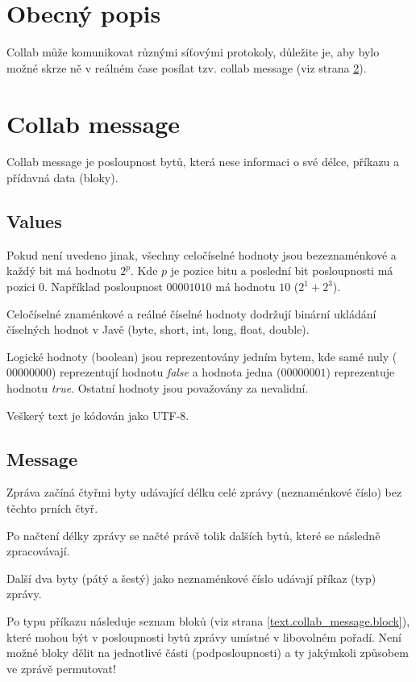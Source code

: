 \documentclass[12pt,oneside,a4paper]{report}
\begin{document}
\tableofcontents
\newpage

\chapter{Obecný popis}

Collab může komunikovat různými síťovými protokoly, důležite je, aby bylo možné skrze ně v reálném čase posílat tzv. collab message (viz strana \ref{text.collab_message}).

\chapter{Collab message}
\label{text.collab_message}

Collab message je posloupnost bytů, která nese informaci o své délce, příkazu a přídavná data (bloky).

\section{Values}

Pokud není uvedeno jinak, všechny celočíselné hodnoty jsou bezeznaménkové a každý bit má hodnotu $2^{p}$. Kde $p$ je pozice bitu a poslední bit posloupnosti má pozici $0$. Například posloupnost $00001010$ má hodnotu $10$ ($2^1 + 2^3$).

Celočíselné znaménkové a reálné číselné hodnoty dodržují binární ukládání číselných hodnot v Javě (byte, short, int, long, float, double).

Logické hodnoty (boolean) jsou reprezentovány jedním bytem, kde samé nuly ($00000000$) reprezentují hodnotu \emph{false} a hodnota jedna ($00000001$) reprezentuje hodnotu \emph{true}. Ostatní hodnoty jsou považovány za nevalidní.

Veškerý text je kódován jako UTF-8.

\section{Message}

Zpráva začíná čtyřmi byty udávající délku celé zprávy (neznaménkové číslo) bez těchto prních čtyř.

Po načtení délky zprávy se načté právě tolik dalších bytů, které se následně zpracovávají.

Další dva byty (pátý a šestý) jako neznaménkové číslo udávají příkaz (typ) zprávy.

Po typu příkazu následuje seznam bloků (viz strana \ref{text.collab_message.block}), které mohou být v posloupnosti bytů zprávy umístné v libovolném pořadí. Není možné bloky dělit na jednotlivé části (podposloupnosti) a ty jakýmkoli způsobem ve zprávě permutovat!
\end{document}
